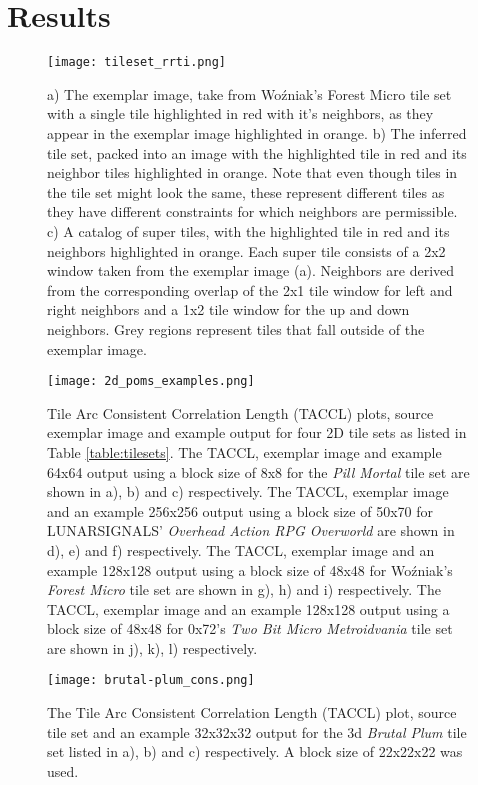 \section{Results}

\begin{figure}[h]
  \texttt{[image: tileset\_rrti.png]}
  \caption{a) The exemplar image, take from Wo\'zniak's Forest Micro tile set with a single tile highlighted in red with it's neighbors, as they appear in
           the exemplar image highlighted in orange.
           b) The inferred tile set, packed into an image with the highlighted tile in red and its neighbor tiles highlighted in orange. Note that even though
           tiles in the tile set might look the same, these represent different tiles as they have different constraints for which neighbors are permissible.
           c) A catalog of super tiles, with the highlighted tile in red and its neighbors highlighted in orange. Each super tile consists of a 2x2 window
           taken from the exemplar image (a). Neighbors are derived from the corresponding overlap of the 2x1 tile window  for left and right neighbors and
           a 1x2 tile window for the up and down neighbors. Grey regions represent tiles that fall outside of the exemplar image. }
  \label{fig:rrti_tileset}
\end{figure}

\begin{figure*}[ht]
  \texttt{[image: 2d\_poms\_examples.png]}
  \caption{Tile Arc Consistent Correlation Length (TACCL) plots, source exemplar image and example output for four 2D tile sets as listed in Table \ref{table:tilesets}.
           The TACCL, exemplar image and example 64x64 output using a block size of 8x8 for the \textit{Pill Mortal} tile set are shown in a), b) and c) respectively. The TACCL, exemplar image and an example 256x256 output using a block size of 50x70 for LUNARSIGNALS' \textit{Overhead Action RPG Overworld} are shown in d), e) and f) respectively. The TACCL, exemplar image and an example 128x128 output using a block size of 48x48 for Wo\'zniak's \textit{Forest Micro} tile set are shown in g), h) and i) respectively. The TACCL, exemplar image and an example 128x128 output using a block size of 48x48 for 0x72's \textit{Two Bit Micro Metroidvania} tile set are shown in j), k), l) respectively. }
  \label{fig:2dexamples}
\end{figure*}

\begin{figure}[h]
  \centering
  \texttt{[image: brutal-plum\_cons.png]}
  \caption{The Tile Arc Consistent Correlation Length (TACCL) plot, source tile set and an example 32x32x32 output for the 3d \textit{Brutal Plum} tile set listed in a), b) and c) respectively. A block size of 22x22x22 was used.}
  \label{fig:brutal_plum}
\end{figure}

